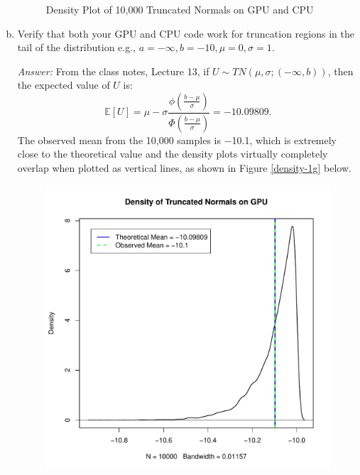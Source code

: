 \documentclass[a4paper, 11pt]{report}
\begin{document}
\begin{enumerate}[a)]
\begin{figure}[H]
					\caption{Density Plot of 10,000 Truncated Normals on GPU and CPU}
					\label{density-1f}
				\end{figure}
			
		\item Verify that both your GPU and CPU code work for truncation regions in the tail of the distribution e.g., $a=-\infty,b=-10,\mu=0,\sigma=1$.
			
			\noindent \textit{Answer:} From the class notes, Lecture 13, if $U \sim TN(\mu,\sigma;(-\infty,b))$, then the expected value of $U$ is: 
				$$ \mathbb{E}[U] = \mu - \sigma \frac{ \phi\left( \frac{b-\mu}{\sigma}\right) }{ \Phi\left( \frac{b-\mu}{\sigma}\right) } = -10.09809.$$
				The observed mean from the 10,000 samples is −10.1, which is extremely close to the theoretical value and the density plots virtually completely overlap when plotted as vertical lines, as shown in Figure \ref{density-1g} below.
				\vspace*{-12pt}
				\begin{figure}[H]
					\centering
					\includegraphics[scale=0.5]{density-1g.pdf}

\end{figure}
\end{enumerate}
\end{document}
